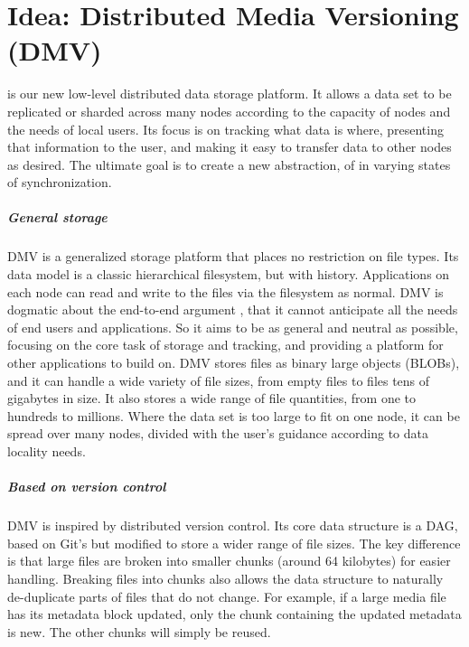 \chapter{Idea: Distributed Media Versioning (DMV)}

 is our new low-level distributed
data storage platform. It allows a data set to be replicated or sharded across
many nodes according to the capacity of nodes and the needs of local users. Its
focus is on tracking what data is where, presenting that information to the
user, and making it easy to transfer data to other nodes as desired. The
ultimate goal is to create a new abstraction, of  in varying states of synchronization.



\paragraph{General storage}

DMV is a generalized storage platform that places no restriction on file types.
Its data model is a classic hierarchical filesystem, but with history.
Applications on each node can read and write to the files via the filesystem as
normal. DMV is dogmatic about the end-to-end argument \cite{endtoendargument},
that it cannot anticipate all the needs of end users and applications. So it
aims to be as general and neutral as possible, focusing on the core task of
storage and tracking, and providing a platform for other applications to build
on. DMV stores files as binary large objects (BLOBs), and it can handle a wide
variety of file sizes, from empty files to files tens of gigabytes in size. It
also stores a wide range of file quantities, from one to hundreds to millions.
Where the data set is too large to fit on one node, it can be spread over many
nodes, divided with the user's guidance according to data locality needs.


\paragraph{Based on version control}

DMV is inspired by distributed version control. Its core data structure is a
DAG, based on Git's but modified to store a wider range of file sizes. The key
difference is that large files are broken into smaller chunks (around 64
kilobytes) for easier handling. Breaking files into chunks also allows the data
structure to naturally de-duplicate parts of files that do not change. For
example, if a large media file has its metadata block updated, only the chunk
containing the updated metadata is new. The other chunks will simply be reused.


